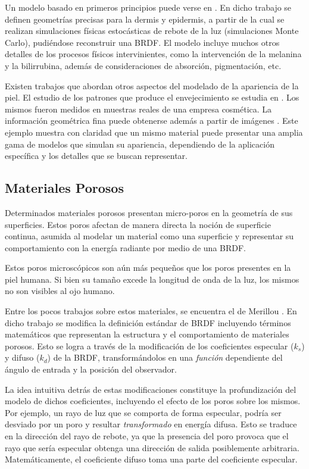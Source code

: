 Un modelo basado en primeros principios puede verse en \cite{Krishnaswamy2004}.
En dicho trabajo se definen geometrías precisas para la dermis y epidermis, a partir de la cual se realizan simulaciones físicas estocásticas de rebote de la luz (simulaciones Monte Carlo), pudiéndose reconstruir una BRDF.
El modelo incluye muchos otros detalles de los procesos físicos intervinientes, como la intervención de la melanina y la bilirrubina, además de consideraciones de absorción, pigmentación, etc.

Existen trabajos que abordan otros aspectos del modelado de la apariencia de la piel.
El estudio de los patrones que produce el envejecimiento se estudia en \cite{Boissieux2000}.
Los mismos fueron medidos en muestras reales de una empresa cosmética.
La información geométrica fina puede obtenerse además a partir de imágenes \cite{Golovinskiy2006}.
Este ejemplo muestra con claridad que un mismo material puede presentar una amplia gama de modelos que simulan su apariencia, dependiendo de la aplicación específica y los detalles que se buscan representar.

\subsection{Materiales Porosos}

Determinados materiales porosos presentan micro-poros en la geometría de sus superficies.
Estos poros afectan de manera directa la noción de superficie continua, asumida al modelar un material como una superficie y representar su comportamiento con la energía radiante por medio de una BRDF.

Estos poros microscópicos son aún más pequeños que los poros presentes en la piel humana.
Si bien su tamaño excede la longitud de onda de la luz, los mismos no son visibles al ojo humano.

Entre los pocos trabajos sobre estos materiales, se encuentra el de Merillou \cite{Merillou2000}.
En dicho trabajo se modifica la definición estándar de BRDF incluyendo términos matemáticos que representan la estructura y el comportamiento de materiales porosos.
Esto se logra a través de la modificación de los coeficientes especular ($k_{s}$) y difuso ($k_{d}$) de la BRDF, transformándolos en una {\em función} dependiente del ángulo de entrada y la posición del observador.

La idea intuitiva detrás de estas modificaciones constituye la profundización del modelo de dichos coeficientes, incluyendo el efecto de los poros sobre los mismos.
Por ejemplo, un rayo de luz que se comporta de forma especular, podría ser desviado por un poro y resultar {\em transformado} en energía difusa.
Esto se traduce en la dirección del rayo de rebote, ya que la presencia del poro provoca que el rayo que sería especular obtenga una dirección de salida posiblemente arbitraria.
Matemáticamente, el coeficiente difuso toma una parte del coeficiente especular.


